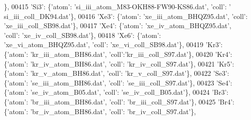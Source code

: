 \begin{DoxyCode}
      \},
00415                              \textcolor{stringliteral}{'Si3'}: \{\textcolor{stringliteral}{'atom'}: \textcolor{stringliteral}{'si\_iii\_atom\_M83-OKH88-FW90-KS86.dat'}, \textcolor{stringliteral}{'coll'}: \textcolor{stringliteral}{'
      si\_iii\_coll\_DK94.dat'}\},
00416                              \textcolor{stringliteral}{'Xe3'}: \{\textcolor{stringliteral}{'atom'}: \textcolor{stringliteral}{'xe\_iii\_atom\_BHQZ95.dat'}, \textcolor{stringliteral}{'coll'}: \textcolor{stringliteral}{'xe\_iii\_coll\_SB98.dat'}\},
00417                              \textcolor{stringliteral}{'Xe4'}: \{\textcolor{stringliteral}{'atom'}: \textcolor{stringliteral}{'xe\_iv\_atom\_BHQZ95.dat'}, \textcolor{stringliteral}{'coll'}: \textcolor{stringliteral}{'xe\_iv\_coll\_SB98.dat'}\},
00418                              \textcolor{stringliteral}{'Xe6'}: \{\textcolor{stringliteral}{'atom'}: \textcolor{stringliteral}{'xe\_vi\_atom\_BHQZ95.dat'}, \textcolor{stringliteral}{'coll'}: \textcolor{stringliteral}{'xe\_vi\_coll\_SB98.dat'}\},
00419                              \textcolor{stringliteral}{'Kr3'}: \{\textcolor{stringliteral}{'atom'}: \textcolor{stringliteral}{'kr\_iii\_atom\_BH86.dat'}, \textcolor{stringliteral}{'coll'}:\textcolor{stringliteral}{'kr\_iii\_coll\_S97.dat'}\},
00420                              \textcolor{stringliteral}{'Kr4'}: \{\textcolor{stringliteral}{'atom'}: \textcolor{stringliteral}{'kr\_iv\_atom\_BH86.dat'}, \textcolor{stringliteral}{'coll'}: \textcolor{stringliteral}{'kr\_iv\_coll\_S97.dat'}\},
00421                              \textcolor{stringliteral}{'Kr5'}: \{\textcolor{stringliteral}{'atom'}: \textcolor{stringliteral}{'kr\_v\_atom\_BH86.dat'}, \textcolor{stringliteral}{'coll'}: \textcolor{stringliteral}{'kr\_v\_coll\_S97.dat'}\},
00422                              \textcolor{stringliteral}{'Se3'}: \{\textcolor{stringliteral}{'atom'}: \textcolor{stringliteral}{'se\_iii\_atom\_BH86.dat'}, \textcolor{stringliteral}{'coll'}: \textcolor{stringliteral}{'se\_iii\_coll\_S97.dat'}\},
00423                              \textcolor{stringliteral}{'Se4'}: \{\textcolor{stringliteral}{'atom'}: \textcolor{stringliteral}{'se\_iv\_atom\_B05.dat'}, \textcolor{stringliteral}{'coll'}: \textcolor{stringliteral}{'se\_iv\_coll\_B05.dat'}\},
00424                              \textcolor{stringliteral}{'Br3'}: \{\textcolor{stringliteral}{'atom'}: \textcolor{stringliteral}{'br\_iii\_atom\_BH86.dat'}, \textcolor{stringliteral}{'coll'}: \textcolor{stringliteral}{'br\_iii\_coll\_S97.dat'}\},
00425                              \textcolor{stringliteral}{'Br4'}: \{\textcolor{stringliteral}{'atom'}: \textcolor{stringliteral}{'br\_iv\_atom\_BH86.dat'}, \textcolor{stringliteral}{'coll'}: \textcolor{stringliteral}{'br\_iv\_coll\_S97.dat'}\},

\end{DoxyCode}
